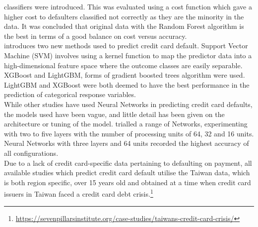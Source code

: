 \documentclass[
]{article}
\begin{document}
classifiers were introduced. This was evaluated using a cost function
which gave a higher cost to defaulters classified not correctly as they
are the minority in the data. It was concluded that original data with
the Random Forest algorithm is the best in terms of a good balance on
cost versus accuracy.\\
\vspace{.3 cm} \citet{Yang2018-rt} introduces two new methods used to
predict credit card default. Support Vector Machine (SVM) involves using
a kernel function to map the predictor data into a high-dimensional
feature space where the outcome classes are easily separable. XGBoost
and LightGBM, forms of gradient boosted trees algorithm were used.
LightGBM and XGBoost were both deemed to have the best performance in
the prediction of categorical response variables.\\
\vspace{.3 cm} While other studies have used Neural Networks in
predicting credit card defaults, the models used have been vague, and
little detail has been given on the architecture or tuning of the model.
\citet{dnn2} trialled a range of Networks, experimenting with two to
five layers with the number of processing units of 64, 32 and 16 units.
Neural Networks with three layers and 64 units recorded the highest
accuracy of all configurations.\\
\vspace{.3 cm} Due to a lack of credit card-specific data pertaining to
defaulting on payment, all available studies which predict credit card
default utilise the Taiwan data, which is both region specific, over 15
years old and obtained at a time when credit card issuers in Taiwan
faced a credit card debt crisis.\footnote{\url{https://sevenpillarsinstitute.org/case-studies/taiwans-credit-card-crisis/}}
\end{document}
